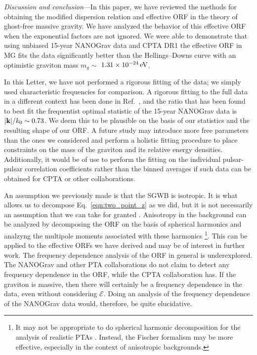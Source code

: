 \documentclass[prd,twocolumn,aps,psfig,nofootinbib,nobibnotes,superscriptaddress,preprintnumbers,times]{revtex4-2}
\newcommand{\eV}{\,{\rm eV}}
\begin{document}
\textit{Discussion and conclusion}---In this paper, we have reviewed the methods for obtaining the modified dispersion relation and effective ORF in the theory of ghost-free massive gravity. We have analyzed the behavior of this effective ORF when the exponential factors are not ignored. We were able to demonstrate that using unbiased 15-year NANOGrav data and CPTA DR1 the effective ORF in MG fits the data significantly better than the Hellings–Downs curve with an optimistic graviton mass $m_g \sim$ $1.31\times10^{-24} \eV$.
%

In this Letter, we have not performed a rigorous fitting of the data; we simply used characteristic frequencies for comparison. A rigorous fitting to the full data in a different context has been done in Ref.~\cite{Arjona:2024cex}, and the ratio that has been found to best fit the frequentist optimal statistic of the 15-year NANOGrav data is $|{\bf k}|/k_0 \sim 0.73$. We deem this to be plausible on the basis of our statistics and the resulting shape of our ORF. A future study may introduce more free parameters than the ones we considered and perform a holistic fitting procedure to place constraints on the mass of the graviton and its relative energy densities. Additionally, it would be of use to perform the fitting on the individual pulsar-pulsar correlation coefficients rather than the binned averages if such data can be obtained for CPTA or other collaborations. 


An assumption we previously made is that the SGWB is isotropic. It is what allows us to decompose Eq.~\ref{eqn:two_point_z} as we did, but it is not necessarily an assumption that we can take for granted \cite{Depta:2024ykq, Bravo:2025csu, Cusin:2025xle, Kuwahara:2024jiz, Li:2024lvt}. Anisotropy in the background can be analyzed by decomposing the ORF on the basis of spherical harmonics and analzyng the multipole moments associated with these harmonics \cite{Allen:2024bnk, Gair:2014rwa}\footnote{It may not be appropriate to do spherical harmonic decomposition for the analysis of realistic PTAs \cite{Ali-Haimoud:2020ozu}. Instead, the Fischer formalism may be more effective, especially in the context of anisotropic backgrounds.}. 
This can be applied to the effective ORFs we have derived and may be of interest in further work. 
%
The frequency dependence analysis of the ORF in general is underexplored. The NANOGrav and other PTA collaborations do not claim to detect any frequency dependence in the ORF, while the CPTA collaboration has. If the graviton is massive, then there will certainly be a frequency dependence in the data, even without considering $\mathcal{E}$. Doing an analysis of the frequency dependence of the NANOGrav data would, therefore, be quite elucidative. 
\end{document}

